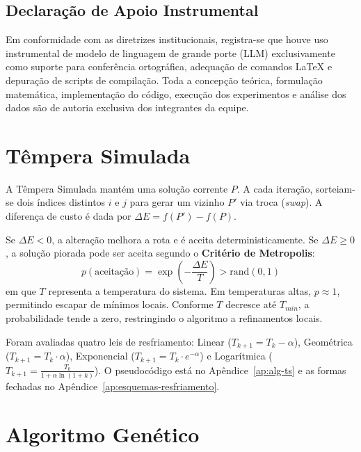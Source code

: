 \documentclass[11pt]{article}
\begin{document}
\subsection{Declaração de Apoio Instrumental}
Em conformidade com as diretrizes institucionais, registra-se que houve uso instrumental de modelo de linguagem de grande porte (LLM) exclusivamente como suporte para conferência ortográfica, adequação de comandos LaTeX e depuração de scripts de compilação. Toda a concepção teórica, formulação matemática, implementação do código, execução dos experimentos e análise dos dados são de autoria exclusiva dos integrantes da equipe.

\section{Têmpera Simulada}

A Têmpera Simulada mantém uma solução corrente $P$. A cada iteração, sorteiam-se dois índices distintos $i$ e $j$ para gerar um vizinho $P'$ via troca (\textit{swap}). A diferença de custo é dada por $\Delta E = f(P') - f(P)$.

Se $\Delta E < 0$, a alteração melhora a rota e é aceita deterministicamente. Se $\Delta E \ge 0$, a solução piorada pode ser aceita segundo o \textbf{Critério de Metropolis}:
\begin{equation} \label{eq:metropolis}
p(\text{aceitação}) = \exp\left(-\frac{\Delta E}{T}\right) > \text{rand}(0, 1)
\end{equation}
em que $T$ representa a temperatura do sistema. Em temperaturas altas, $p \approx 1$, permitindo escapar de mínimos locais. Conforme $T$ decresce até $T_{min}$, a probabilidade tende a zero, restringindo o algoritmo a refinamentos locais.

Foram avaliadas quatro leis de resfriamento:
Linear ($T_{k+1} = T_k - \alpha$),
Geométrica ($T_{k+1} = T_k \cdot \alpha$),
Exponencial ($T_{k+1} = T_k \cdot e^{-\alpha}$) e
Logarítmica ($T_{k+1} = \frac{T_0}{1 + \alpha \ln(1 + k)}$).
O pseudocódigo está no Apêndice~\ref{ap:alg-ts} e as formas fechadas no Apêndice~\ref{ap:esquemas-resfriamento}.

\section{Algoritmo Genético}
\end{document}
